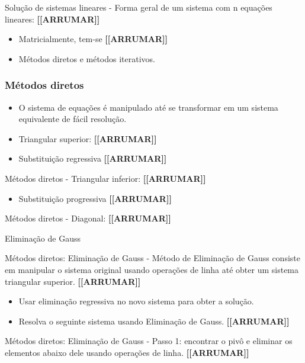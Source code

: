 \documentclass[
]{article}
\providecommand{\tightlist}{%
  \setlength{\itemsep}{0pt}\setlength{\parskip}{0pt}}
\begin{document}
Solução de sistemas lineares - Forma geral de um sistema com n equações
lineares: \textbf{{[}{[}ARRUMAR{]}{]}}

\begin{itemize}
\item
  Matricialmente, tem-se \textbf{{[}{[}ARRUMAR{]}{]}}
\item
  Métodos diretos e métodos iterativos.
\end{itemize}

\hypertarget{muxe9todos-diretos}{%
\subsubsection{Métodos diretos}\label{muxe9todos-diretos}}

\begin{itemize}
\item
  O sistema de equações é manipulado até se transformar em um sistema
  equivalente de fácil resolução.
\item
  Triangular superior: \textbf{{[}{[}ARRUMAR{]}{]}}
\item
  Substituição regressiva \textbf{{[}{[}ARRUMAR{]}{]}}
\end{itemize}

Métodos diretos - Triangular inferior: \textbf{{[}{[}ARRUMAR{]}{]}}

\begin{itemize}
\tightlist
\item
  Substituição progressiva \textbf{{[}{[}ARRUMAR{]}{]}}
\end{itemize}

Métodos diretos - Diagonal: \textbf{{[}{[}ARRUMAR{]}{]}}

Eliminação de Gauss

Métodos diretos: Eliminação de Gauss - Método de Eliminação de Gauss
consiste em manipular o sistema original usando operações de linha até
obter um sistema triangular superior. \textbf{{[}{[}ARRUMAR{]}{]}}

\begin{itemize}
\tightlist
\item
  Usar eliminação regressiva no novo sistema para obter a solução.
\item
  Resolva o seguinte sistema usando Eliminação de Gauss.
  \textbf{{[}{[}ARRUMAR{]}{]}}
\end{itemize}

Métodos diretos: Eliminação de Gauss - Passo 1: encontrar o pivô e
eliminar os elementos abaixo dele usando operações de linha.
\textbf{{[}{[}ARRUMAR{]}{]}}
\end{document}
